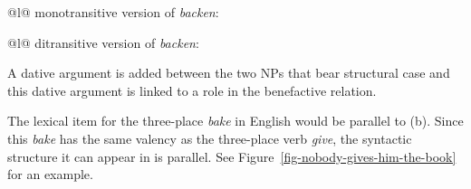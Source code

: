 \eal
\ex 
\begin{tabular}[t]{@{}l@{}}
monotransitive version of \emph{backen}:\\
\end{tabular}
\ex
\begin{tabular}[t]{@{}l@{}}
ditransitive version of \emph{backen}:\\
\end{tabular}
\zl
A dative argument is added between the two NPs that bear structural case and this dative argument is
linked to a role in the benefactive relation.

The lexical item for the three-place \emph{bake} in English would be parallel to (b). Since
this \emph{bake} has the same valency as the three-place verb \emph{give}, the syntactic structure
it can appear in is parallel. See Figure~\ref{fig-nobody-gives-him-the-book} for an example.


